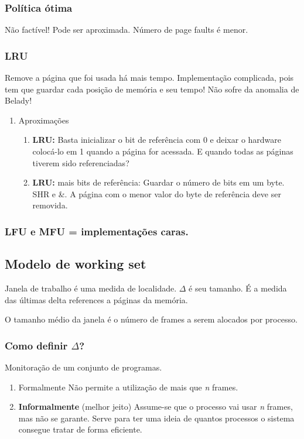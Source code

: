 \documentclass[11pt]{article}
\begin{document}
\subsubsection{Política ótima}
\label{sec:org706c393}
Não factível! Pode ser aproximada. Número de page faults é menor.

\subsubsection{LRU}
\label{sec:org20c6884}
Remove a página que foi usada há mais tempo. Implementação complicada, pois tem que
guardar cada posição de memória e seu tempo! Não sofre da anomalia de Belady!
\begin{enumerate}
\item Aproximações
\label{sec:org4f89146}
\begin{enumerate}
\item \textbf{LRU:} Basta inicializar o bit de referência com 0 e deixar o hardware colocá-lo em 1 quando
a página for acessada. E quando todas as páginas tiverem sido referenciadas?
\item \textbf{LRU:} mais bits de referência: Guardar o número de bits em um byte. SHR e \&. A página com o menor valor do byte
de referência deve ser removida.
\end{enumerate}
\end{enumerate}


\subsubsection{LFU e MFU = implementações caras.}
\label{sec:orga53e4b3}

\subsection{Modelo de working set}
\label{sec:org873c0e3}
Janela de trabalho é uma medida de localidade. \(\Delta\) é seu tamanho. É a medida das
últimas delta references a páginas da memória.

O tamanho médio da janela é o número de frames a serem alocados por processo.

\subsubsection{Como definir \(\Delta\)?}
\label{sec:org54b0245}
Monitoração de um conjunto de programas.

\begin{enumerate}
\item Formalmente Não permite a utilização de mais que \emph{n} frames.
\item \textbf{Informalmente} (melhor jeito) Assume-se que o processo vai usar \emph{n} frames, mas não se garante.
Serve para ter uma ideia de quantos processos o sistema consegue tratar de forma eficiente.
\end{enumerate}
\end{document}

